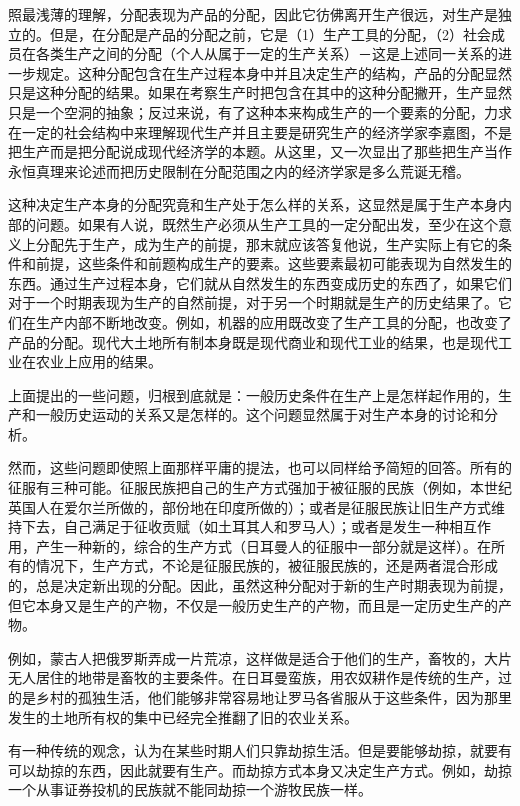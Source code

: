 \documentclass[a4paper,twoside,12pt,AutoFakeBold]{ctexart}
\begin{document}
照最浅薄的理解，分配表现为产品的分配，因此它彷佛离开生产很远，对生产是独立的。但是，在分配是产品的分配之前，它是（1）生产工具的分配，（2）社会成员在各类生产之间的分配（个人从属于一定的生产关系）－这是上述同一关系的进一步规定。这种分配包含在生产过程本身中并且决定生产的结构，产品的分配显然只是这种分配的结果。如果在考察生产时把包含在其中的这种分配撇开，生产显然只是一个空洞的抽象；反过来说，有了这种本来构成生产的一个要素的分配，力求在一定的社会结构中来理解现代生产并且主要是研究生产的经济学家李嘉图，不是把生产而是把分配说成现代经济学的本题。从这里，又一次显出了那些把生产当作永恒真理来论述而把历史限制在分配范围之内的经济学家是多么荒诞无稽。

这种决定生产本身的分配究竟和生产处于怎么样的关系，这显然是属于生产本身内部的问题。如果有人说，既然生产必须从生产工具的一定分配出发，至少在这个意义上分配先于生产，成为生产的前提，那末就应该答复他说，生产实际上有它的条件和前提，这些条件和前题构成生产的要素。这些要素最初可能表现为自然发生的东西。通过生产过程本身，它们就从自然发生的东西变成历史的东西了，如果它们对于一个时期表现为生产的自然前提，对于另一个时期就是生产的历史结果了。它们在生产内部不断地改变。例如，机器的应用既改变了生产工具的分配，也改变了产品的分配。现代大土地所有制本身既是现代商业和现代工业的结果，也是现代工业在农业上应用的结果。

上面提出的一些问题，归根到底就是：一般历史条件在生产上是怎样起作用的，生产和一般历史运动的关系又是怎样的。这个问题显然属于对生产本身的讨论和分析。

然而，这些问题即使照上面那样平庸的提法，也可以同样给予简短的回答。所有的征服有三种可能。征服民族把自己的生产方式强加于被征服的民族（例如，本世纪英国人在爱尔兰所做的，部份地在印度所做的）；或者是征服民族让旧生产方式维持下去，自己满足于征收贡赋（如土耳其人和罗马人）；或者是发生一种相互作用，产生一种新的，综合的生产方式（日耳曼人的征服中一部分就是这样）。在所有的情况下，生产方式，不论是征服民族的，被征服民族的，还是两者混合形成的，总是决定新出现的分配。因此，虽然这种分配对于新的生产时期表现为前提，但它本身又是生产的产物，不仅是一般历史生产的产物，而且是一定历史生产的产物。

例如，蒙古人把俄罗斯弄成一片荒凉，这样做是适合于他们的生产，畜牧的，大片无人居住的地带是畜牧的主要条件。在日耳曼蛮族，用农奴耕作是传统的生产，过的是乡村的孤独生活，他们能够非常容易地让罗马各省服从于这些条件，因为那里发生的土地所有权的集中已经完全推翻了旧的农业关系。

有一种传统的观念，认为在某些时期人们只靠劫掠生活。但是要能够劫掠，就要有可以劫掠的东西，因此就要有生产。而劫掠方式本身又决定生产方式。例如，劫掠一个从事证券投机的民族就不能同劫掠一个游牧民族一样。
\end{document}
